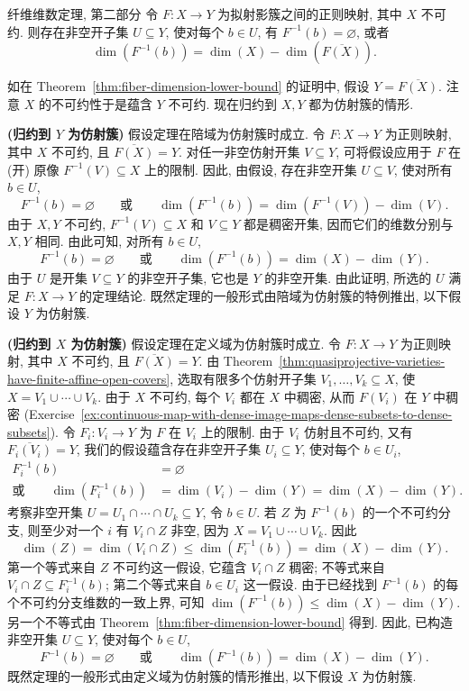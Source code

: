 \begin{Theorem}{纤维维数定理, 第二部分}\leavevmode\label{thm:fiber-dimension-equality-on-open-subset}
令 $F:X\to Y$ 为拟射影簇之间的正则映射, 其中 $X$ 不可约. 则存在非空开子集 $U\subseteq Y$, 使对每个 $b\in U$, 有 $F^{-1}(b)=\varnothing$, 或者
\[
  \dim(F^{-1}(b))=\dim(X)-\dim(\overline{F(X)}).
\]
\end{Theorem}
\begin{Proof}
如在 Theorem~\ref{thm:fiber-dimension-lower-bound} 的证明中, 假设 $Y=\overline{F(X)}$. 注意 $X$ 的不可约性于是蕴含 $Y$ 不可约. 现在归约到 $X,Y$ 都为仿射簇的情形.

\textbf{(归约到 $Y$ 为仿射簇)} 假设定理在陪域为仿射簇时成立. 令 $F:X\to Y$ 为正则映射, 其中 $X$ 不可约, 且 $\overline{F(X)}=Y$. 对任一非空仿射开集 $V\subseteq Y$, 可将假设应用于 $F$ 在 (开) 原像 $F^{-1}(V)\subseteq X$ 上的限制. 因此, 由假设, 存在非空开集 $U\subseteq V$, 使对所有 $b\in U$,
\[
  F^{-1}(b)=\varnothing\qquad\text{或}\qquad
  \dim(F^{-1}(b))=\dim(F^{-1}(V))-\dim(V).
\]
由于 $X,Y$ 不可约, $F^{-1}(V)\subseteq X$ 和 $V\subseteq Y$ 都是稠密开集, 因而它们的维数分别与 $X,Y$ 相同. 由此可知, 对所有 $b\in U$,
\[
  F^{-1}(b)=\varnothing\qquad\text{或}\qquad
  \dim(F^{-1}(b))=\dim(X)-\dim(Y).
\]
由于 $U$ 是开集 $V\subseteq Y$ 的非空开子集, 它也是 $Y$ 的非空开集. 由此证明, 所选的 $U$ 满足 $F:X\to Y$ 的定理结论. 既然定理的一般形式由陪域为仿射簇的特例推出, 以下假设 $Y$ 为仿射簇.

\textbf{(归约到 $X$ 为仿射簇)} 假设定理在定义域为仿射簇时成立. 令 $F:X\to Y$ 为正则映射, 其中 $X$ 不可约, 且 $\overline{F(X)}=Y$. 由 Theorem~\ref{thm:quasiprojective-varieties-have-finite-affine-open-covers}, 选取有限多个仿射开子集 $V_{1},\ldots,V_{k}\subseteq X$, 使 $X=V_{1}\cup\cdots\cup V_{k}$. 由于 $X$ 不可约, 每个 $V_{i}$ 都在 $X$ 中稠密, 从而 $F(V_{i})$ 在 $Y$ 中稠密 (Exercise~\ref{ex:continuous-map-with-dense-image-maps-dense-subsets-to-dense-subsets}). 令 $F_{i}:V_{i}\to Y$ 为 $F$ 在 $V_{i}$ 上的限制. 由于 $V_{i}$ 仿射且不可约, 又有 $\overline{F_{i}(V_{i})}=Y$, 我们的假设蕴含存在非空开子集 $U_{i}\subseteq Y$, 使对每个 $b\in U_{i}$,
\[
  \begin{aligned}
  F_{i}^{-1}(b)&=\varnothing\\
  \text{或}\qquad\dim(F_{i}^{-1}(b))&=\dim(V_{i})-\dim(Y)=\dim(X)-\dim(Y).
  \end{aligned}
\]
考察非空开集 $U=U_{1}\cap\cdots\cap U_{k}\subseteq Y$, 令 $b\in U$. 若 $Z$ 为 $F^{-1}(b)$ 的一个不可约分支, 则至少对一个 $i$ 有 $V_{i}\cap Z$ 非空, 因为 $X=V_{1}\cup\cdots\cup V_{k}$. 因此
\[
  \dim(Z)=\dim(V_{i}\cap Z)\le\dim(F_{i}^{-1}(b))=\dim(X)-\dim(Y).
\]
第一个等式来自 $Z$ 不可约这一假设, 它蕴含 $V_{i}\cap Z$ 稠密; 不等式来自 $V_{i}\cap Z\subseteq F_{i}^{-1}(b)$; 第二个等式来自 $b\in U_{i}$ 这一假设. 由于已经找到 $F^{-1}(b)$ 的每个不可约分支维数的一致上界, 可知 $\dim(F^{-1}(b))\le\dim(X)-\dim(Y)$. 另一个不等式由 Theorem~\ref{thm:fiber-dimension-lower-bound} 得到. 因此, 已构造非空开集 $U\subseteq Y$, 使对每个 $b\in U$,
\[
  F^{-1}(b)=\varnothing\qquad\text{或}\qquad
  \dim(F^{-1}(b))=\dim(X)-\dim(Y).
\]
既然定理的一般形式由定义域为仿射簇的情形推出, 以下假设 $X$ 为仿射簇.


\end{Proof}
